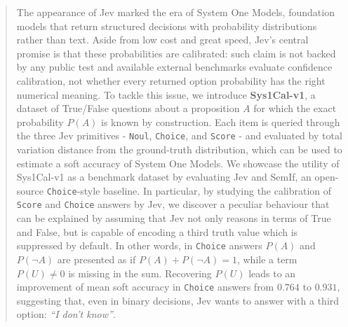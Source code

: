 \documentclass[twoside]{article}
\begin{document}


\begin{abstract}
The appearance of Jev marked the era of System One Models, foundation models that return structured decisions with probability distributions rather than text. Aside from low cost and great speed, Jev's central promise is that these probabilities are calibrated: such claim is not backed by any public test and available external benchmarks evaluate confidence calibration, not whether every returned option probability has the right numerical meaning.
To tackle this issue, we introduce \textbf{Sys1Cal-v1}, a dataset of True/False questions about a proposition $A$ for which the exact probability $P(A)$ is known by construction. Each item is queried through the three Jev primitives - \texttt{Noul}, \texttt{Choice}, and \texttt{Score} - and evaluated by total variation distance from the ground-truth distribution, which can be used to estimate a soft accuracy of System One Models. We showcase the utility of Sys1Cal-v1 as a benchmark dataset by evaluating Jev and SemIf, an open-source \texttt{Choice}-style baseline. In particular, by studying the calibration of \texttt{Score} and \texttt{Choice} answers by Jev, we discover a peculiar behaviour that can be explained by assuming that Jev not only reasons in terms of True and False, but is capable of encoding a third truth value which is suppressed by default. In other words, in \texttt{Choice} answers $P(A)$ and $P(\neg A)$ are presented as if $P(A)+P(\neg A)=1$, while a term $P(U)\neq0$ is missing in the sum. Recovering $P(U)$ leads to an improvement of mean soft accuracy in \texttt{Choice} answers from $0.764$ to $0.931$, suggesting that, even in binary decisions, Jev wants to answer with a third option: \textit{``I don't know''}.
\end{abstract}
\end{document}
